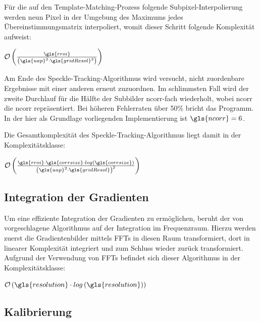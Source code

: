 Für die auf den Template-Matching-Prozess folgende Subpixel-Interpolierung werden neun Pixel in der Umgebung des Maximums jedes Übereinstimmungsmatrix interpoliert, womit dieser Schritt folgende Komplexität aufweist:

\begin{center}
	$\mathcal{O}\left(\frac{\gls{rroi}}{\left(\gls{uap}^2 \cdot \gls{gridResol}^2\right)}\right)$
\end{center}

Am Ende des Speckle-Tracking-Algorithmus wird versucht, nicht zuordenbare Ergebnisse mit einer anderen   erneut zuzuordnen. Im schlimmsten Fall wird der zweite Durchlauf für die Hälfte der Subbilder \gls{ncorr}-fach wiederholt, wobei \gls{ncorr} die \glsdesc{ncorr} repräsentiert. Bei höheren Fehlerraten über 50\% bricht das Programm. In der hier als Grundlage vorliegenden Implementierung ist $\gls{ncorr} = 6$.

Die Gesamtkomplexität des Speckle-Tracking-Algorithmus liegt damit in der Komplexitätsklasse:

\begin{center}
	$\mathcal{O}\left(\frac{\gls{rroi} \cdot \gls{corrsize} \cdot log\left(\gls{corrsize}\right)}{\left(\gls{uap}^2 \cdot \gls{gridResol}\right)^2}\right)$
\end{center}

\subsection{Integration der Gradienten}

Um eine effiziente Integration der Gradienten zu ermöglichen, beruht der von \citeauthor{FC88} vorgeschlagene Algorithmus auf der Integration im Frequenzraum. Hierzu werden zuerst die Gradientenbilder mittels \glspl{FFT} in diesen Raum transformiert, dort in linearer Komplexität integriert und zum Schluss wieder zurück transformiert. 
Aufgrund der Verwendung von \glspl{FFT} befindet sich dieser Algorithmus in der Komplexitätsklasse:

\begin{center}
	$\mathcal{O}\left(\gls{resolution} \cdot log\left(\gls{resolution}\right)\right)$
\end{center}

\subsection{Kalibrierung}

